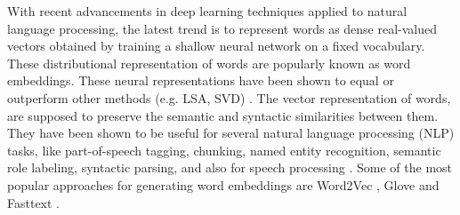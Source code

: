 \documentclass[conference]{IEEEtran}
\begin{document}
With recent advancements in deep learning techniques applied to natural language processing, the latest trend is to represent words as dense real-valued vectors obtained by training a shallow neural network on a fixed vocabulary. These distributional representation of words are popularly known as word embeddings. These neural representations have been shown to equal or outperform other methods (e.g. LSA, SVD) \cite{baroni2014don}. The vector representation of words, are supposed to preserve the semantic and syntactic similarities between them. They have been shown to be useful for several natural language processing (NLP) tasks, like part-of-speech tagging, chunking, named entity recognition, semantic role labeling, syntactic parsing, and also for speech processing \cite{collobert2011natural}. Some of the most popular approaches for generating word embeddings are Word2Vec \cite{mikolov2013distributed}, Glove \cite{pennington2014glove} and Fasttext \cite{bojanowski2016enriching}.
\end{document}
